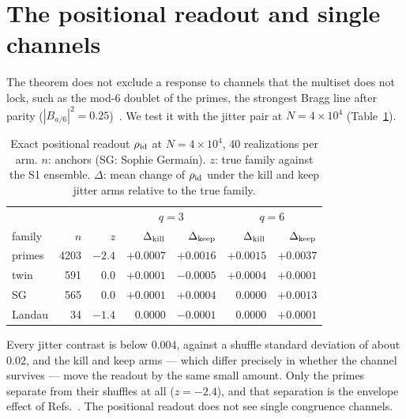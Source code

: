 \documentclass[reprint,amsmath,amssymb,aps,pre,longbibliography]{revtex4-2}
\begin{document}
\section{The positional readout and single channels}\label{sec:rho}

The theorem does not exclude a response to channels that the multiset does not lock, such as the
mod-6 doublet of the primes, the strongest Bragg line after parity
($|B_{a/6}|^2=0.25$)~\cite{Torquato2018}. We test it with the jitter pair at $N=4\times10^4$
(Table~\ref{tab:rho}).

\begin{table}[t]
\caption{Exact positional readout $\rho_{\rm id}$ at $N=4\times10^4$, 40 realizations per arm.
$n$: anchors (SG: Sophie Germain). $z$: true family against the S1 ensemble. $\Delta$: mean change of $\rho_{\rm id}$ under the
kill and keep jitter arms relative to the true family.}
\label{tab:rho}
\footnotesize
\setlength{\tabcolsep}{3pt}
\begin{ruledtabular}
\begin{tabular}{lrrrrrr}
 & & & \multicolumn{2}{c}{$q=3$} & \multicolumn{2}{c}{$q=6$}\\
family & $n$ & $z$ & $\Delta_{\rm kill}$ & $\Delta_{\rm keep}$ & $\Delta_{\rm kill}$ & $\Delta_{\rm keep}$\\ \hline
primes & 4203 & $-2.4$ & $+0.0007$ & $+0.0016$ & $+0.0015$ & $+0.0037$\\
twin & 591 & $0.0$ & $+0.0001$ & $-0.0005$ & $+0.0004$ & $+0.0001$\\
SG & 565 & $0.0$ & $+0.0001$ & $+0.0004$ & $0.0000$ & $+0.0013$\\
Landau & 34 & $-1.4$ & $0.0000$ & $-0.0001$ & $0.0000$ & $+0.0001$\\
\end{tabular}
\end{ruledtabular}
\end{table}

Every jitter contrast is below $0.004$, against a shuffle standard deviation of about $0.02$, and
the kill and keep arms --- which differ precisely in whether the channel survives --- move the
readout by the same small amount. Only the primes separate from their shuffles at all ($z=-2.4$),
and that separation is the envelope effect of Refs.~\cite{PDTP4,Merged}. The positional readout
does not see single congruence channels.
\end{document}
